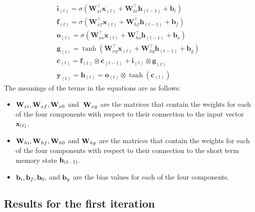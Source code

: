 \documentclass[10pt]{article} %
\begin{document}
\begin{equation} 
    \begin{array}{l}
    \mathbf{i}_{(t)}=\sigma\left(\mathbf{W}_{x i}^{\top} \mathbf{x}_{(t)}+\mathbf{W}_{h i}^{\top} \mathbf{h}_{(t-1)}+\mathbf{b}_{i}\right) \\
    \mathbf{f}_{(t)}=\sigma\left(\mathbf{W}_{x f}^{\top} \mathbf{x}_{(t)}+\mathbf{W}_{h f}^{\top} \mathbf{h}_{(t-1)}+\mathbf{b}_{f}\right) \\
    \mathbf{o}_{(t)}=\sigma\left(\mathbf{W}_{x o}^{\top} \mathbf{x}_{(t)}+\mathbf{W}_{h o}^{\top} \mathbf{h}_{(t-1)}+\mathbf{b}_{o}\right) \\
    \mathbf{g}_{(t)}=\tanh \left(\mathbf{W}_{x g}^{\top} \mathbf{x}_{(t)}+\mathbf{W}_{h g}^{\top} \mathbf{h}_{(t-1)}+\mathbf{b}_{g}\right) \\
    \mathbf{c}_{(t)}=\mathbf{f}_{(t)} \otimes \mathbf{c}_{(t-1)}+\mathbf{i}_{(t)} \otimes \mathbf{g}_{(t)} \\
    \mathbf{y}_{(t)}=\mathbf{h}_{(t)}=\mathbf{o}_{(t)} \otimes \tanh \left(\mathbf{c}_{(t)}\right)
    \end{array}
    \label{systemformula}
\end{equation}
The meanings of the terms in the equations are as follows:

\begin{itemize}
    \item  ${\bf W}_{xi} , {\bf W}_{xf} , {\bf W}_{x0}$ and $\: {\bf W}_{xg}$ are the matrices that contain the weights for each of the four components with respect to their connection to the input vector ${\bf x}_{(t)}$.
   
    \item ${\bf W}_{hi} , {\bf W}_{hf} , {\bf W}_{h0}$ and ${\bf W}_{hg}$ are the matrices that contain the weights for each of the four components with respect to their connection to the short term memory state ${\bf h}_{(t-1)}$.
    
    \item ${\bf b}_{i} , {\bf b}_{f}, {\bf b}_{0},$  and ${\bf b}_{g}$ are the bias values for each of the four components. 

\end{itemize}

\clearpage



    
    \subsection{Results for the first iteration}
\end{document}
